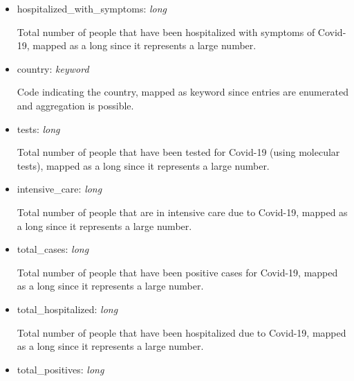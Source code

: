 \documentclass[12pt, a4paper]{article}
\begin{document}
\begin{itemize}
\begin{itemize}
\begin{footnotesize}
        \end{footnotesize}
      \item hospitalized\_with\_symptoms: \emph{long} \\
        \begin{footnotesize}
          Total number of people that have been hospitalized with symptoms of Covid-19,
          mapped as a long since it represents a large number.
        \end{footnotesize}
      \item country: \emph{keyword} \\
        \begin{footnotesize}
          Code indicating the country, mapped as keyword since entries are 
          enumerated and aggregation is possible.
        \end{footnotesize}
      \item tests: \emph{long} \\
        \begin{footnotesize}
          Total number of people that have been tested for Covid-19 (using molecular 
          tests), mapped as a long since it represents a large number.
        \end{footnotesize}
      \item intensive\_care: \emph{long} \\
        \begin{footnotesize}
          Total number of people that are in intensive care due to Covid-19, mapped as 
          a long since it represents a large number.
        \end{footnotesize}
      \item total\_cases: \emph{long} \\
        \begin{footnotesize}
          Total number of people that have been positive cases for Covid-19, mapped as 
          a long since it represents a large number.
        \end{footnotesize}
      \item total\_hospitalized: \emph{long} \\
        \begin{footnotesize}
          Total number of people that have been hospitalized due to Covid-19, mapped as 
          a long since it represents a large number.
        \end{footnotesize}
      \item total\_positives: \emph{long} \\

\end{itemize}
\end{itemize}
\end{document}
